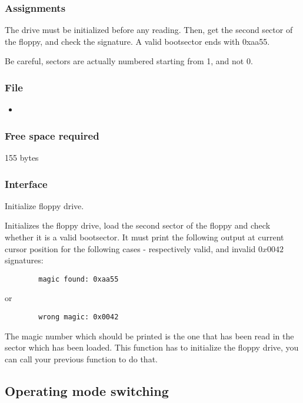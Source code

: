 \subsubsection*{Assignments}
The drive must be initialized before any reading. Then, get the second sector of
the floppy, and check the signature. A valid bootsector ends with 0xaa55.

Be careful, sectors are actually numbered starting from 1, and not 0.

\subsubsection*{File}
\begin{itemize}
  \item {}
\end{itemize}

\subsubsection*{Free space required}
155 bytes

\subsubsection*{Interface}
{
  Initialize floppy drive.
}

{
  Initializes the floppy drive, load the second sector of the floppy and
  check whether it is a valid
  bootsector. It must print the following output at current cursor
  position for the following cases - respectively valid, and invalid $0x0042$
  signatures:
}
\begin{verbatim}
        magic found: 0xaa55
\end{verbatim}
\command{}
{
  or
}
\begin{verbatim}
        wrong magic: 0x0042
\end{verbatim}

\command{}
{
  The magic number which should be printed is the one that has been read in
  the sector which has been loaded.
  This function has to initialize the floppy drive, you can call your previous
  function to do that.
}

%
%

\newpage

\subsection{Operating mode switching}

